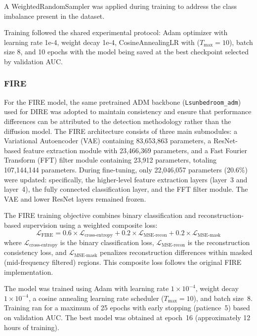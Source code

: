 A WeightedRandomSampler was applied during training to address the class imbalance present in the dataset.

Training followed the shared experimental protocol: Adam optimizer with learning rate 1e-4, weight decay 1e-4, CosineAnnealingLR with ($T_{\max}=10$), batch size 8, and 10 epochs with the model being saved at the best checkpoint selected by validation AUC.

\subsubsection{FIRE}
\label{subsubsec:fire-ft}
For the FIRE model, the same pretrained ADM backbone (\texttt{Lsunbedroom\_adm}) used for DIRE was adopted to maintain consistency and ensure that performance differences can be attributed to the detection methodology rather than the diffusion model.
The FIRE architecture consists of three main submodules: a Variational Autoencoder (VAE) containing 83,653,863 parameters, a ResNet-based feature extraction module with 23,466,369 parameters, and a Fast Fourier Transform (FFT) filter module containing 23,912 parameters, totaling 107,144,144 parameters.
During fine-tuning, only 22,046,057 parameters (20.6\%) were updated: specifically, the higher-level feature extraction layers (layer~3 and layer~4), the fully connected classification layer, and the FFT filter module. The VAE and lower ResNet layers remained frozen.

The FIRE training objective combines binary classification and reconstruction-based supervision using a weighted composite loss:
\begin{equation}
\mathcal{L}_{\text{FIRE}} = 0.6 \times \mathcal{L}_{\text{cross-entropy}} + 0.2 \times \mathcal{L}_{\text{MSE-recon}} + 0.2 \times \mathcal{L}_{\text{MSE-mask}}
\end{equation}
where $\mathcal{L}_{\text{cross-entropy}}$ is the binary classification loss, $\mathcal{L}_{\text{MSE-recon}}$ is the reconstruction consistency loss, and $\mathcal{L}_{\text{MSE-mask}}$ penalizes reconstruction differences within masked (mid-frequency filtered) regions. This composite loss follows the original FIRE implementation.

The model was trained using Adam with learning rate $1 \times 10^{-4}$, weight decay $1 \times 10^{-4}$, a cosine annealing learning rate scheduler ($T_{\max}=10$), and batch size~8. Training ran for a maximum of 25 epochs with early stopping (patience~5) based on validation AUC. The best model was obtained at epoch~16 (approximately 12 hours of training).

